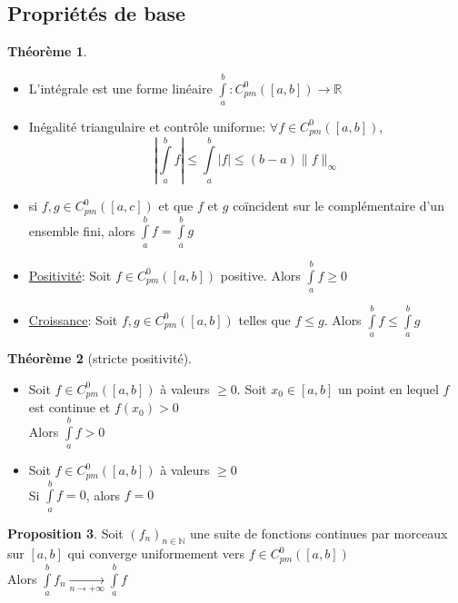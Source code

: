 \documentclass[10pt,a4paper]{article}
\theoremstyle{definition}
\newtheorem{proposition}{Proposition}[section]
\newtheorem{theorem}[proposition]{Théorème}
\begin{document}
\subsection{Propriétés de base}
\begin{theorem}
\hfill
\begin{itemize}
\item L'intégrale est une forme linéaire $\int\limits_a^b : C_{pm}^{0}([a, b]) \to \mathbb{R}$
\item Inégalité triangulaire et contrôle uniforme: $\forall f \in C_{pm}^{0}([a, b])$,
\[\left|\int\limits_a^b f \right| \leq \int\limits_a^b |f| \leq (b-a) \lVert f \rVert_\infty\]
\item si $f, g \in C_{pm}^{0}([a, c])$ et que $f$ et $g$ coïncident sur le complémentaire d'un ensemble fini, alors $\int\limits_a^b f = \int\limits_a^b g$
\item \uline{Positivité}: Soit $f \in C_{pm}^{0}([a, b])$ positive. Alors $\int\limits_a^b f \geq 0$
\item \uline{Croissance}: Soit $f, g \in C_{pm}^{0}([a, b])$ telles que $f \leq g$. Alors $\int\limits_a^b f \leq \int\limits_a^b g$
\end{itemize}
\end{theorem}
\begin{theorem}[stricte positivité]
\hfill
\begin{itemize}
\item Soit $f \in C_{pm}^{0}([a, b])$ à valeurs $\geq 0$. Soit $x_0 \in [a, b]$ un point en lequel $f$ est continue et $f(x_0) > 0$ \\
Alors $\int\limits_{a}^{b} f > 0$
\item Soit $f \in C_{pm}^{0}([a, b])$ à valeurs $\geq 0$ \\
Si $\int\limits_{a}^{b} f = 0$, alors $f = 0$
\end{itemize}
\end{theorem}
\begin{proposition}
Soit $(f_n)_{n \in \mathbb{N}}$ une suite de fonctions continues par morceaux sur $[a, b]$ qui converge uniformement vers $f \in C_{pm}^{0}([a, b])$ \\
Alors $\int\limits_{a}^{b} f_n \xrightarrow[n \to +\infty]{} \int\limits_{a}^{b} f$
\end{proposition}
\end{document}
